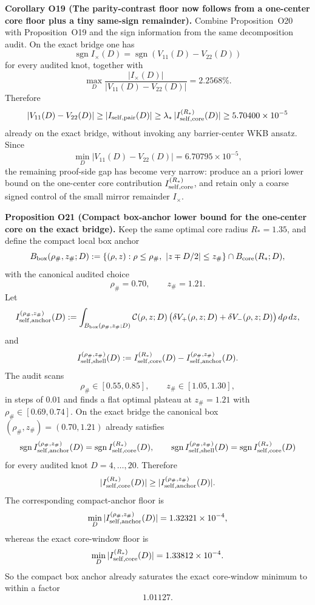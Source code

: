 \documentclass[aps,prd,onecolumn,notitlepage,nofootinbib,superscriptaddress,11pt,floatfix]{revtex4-2}
\begin{document}
\medskip\noindent\textbf{Corollary O19 (The parity-contrast floor now follows from a one-center core floor plus a tiny same-sign remainder).}
Combine Proposition~O20 with Proposition~O19 and the sign information from the same decomposition audit. On the exact bridge one has
\[
\operatorname{sgn} I_\times(D)=\operatorname{sgn}(V_{11}(D)-V_{22}(D))
\]
for every audited knot, together with
\[
\max_D \frac{|I_\times(D)|}{|V_{11}(D)-V_{22}(D)|}=2.2568\%.
\]
Therefore
\[
|V_{11}(D)-V_{22}(D)|
\ge
|I_{\rm self,pair}(D)|
\ge
\lambda_\ast\,|I_{\rm self,core}^{(R_\ast)}(D)|
\ge
5.70400\times10^{-5}
\]
already on the exact bridge, without invoking any barrier-center WKB ansatz. Since
\[
\min_D |V_{11}(D)-V_{22}(D)|=6.70795\times10^{-5},
\]
the remaining proof-side gap has become very narrow: produce an a priori lower bound on the one-center core contribution \(I_{\rm self,core}^{(R_\ast)}\), and retain only a coarse signed control of the small mirror remainder \(I_\times\).

\medskip\noindent\textbf{Proposition O21 (Compact box-anchor lower bound for the one-center core on the exact bridge).}
Keep the same optimal core radius \(R_\ast=1.35\), and define the compact local box anchor
\[
B_{\rm box}(\rho_\#,z_\#;D)
:=
\left\{(\rho,z): \rho\le \rho_\#,\ |z\mp D/2|\le z_\#\right\}\cap B_{\rm core}(R_\ast;D),
\]
with the canonical audited choice
\[
\rho_\#=0.70,\qquad z_\#=1.21.
\]
Let
\[
I_{\rm self,anchor}^{(\rho_\#,z_\#)}(D)
:=
\int_{B_{\rm box}(\rho_\#,z_\#;D)}
\mathcal C(\rho,z;D)\,
\bigl(\delta V_+(\rho,z;D)+\delta V_-(\rho,z;D)\bigr)\,d\rho\,dz,
\]
and
\[
I_{\rm self,shell}^{(\rho_\#,z_\#)}(D)
:=
I_{\rm self,core}^{(R_\ast)}(D)-I_{\rm self,anchor}^{(\rho_\#,z_\#)}(D).
\]
The audit  scans
\[
\rho_\#\in[0.55,0.85],\qquad z_\#\in[1.05,1.30],
\]
in steps of \(0.01\) and finds a flat optimal plateau at \(z_\#=1.21\) with \(\rho_\#\in[0.69,0.74]\).  On the exact bridge the canonical box \((\rho_\#,z_\#)=(0.70,1.21)\) already satisfies
\[
\operatorname{sgn} I_{\rm self,anchor}^{(\rho_\#,z_\#)}(D)
=
\operatorname{sgn} I_{\rm self,core}^{(R_\ast)}(D),
\qquad
\operatorname{sgn} I_{\rm self,shell}^{(\rho_\#,z_\#)}(D)
=
\operatorname{sgn} I_{\rm self,core}^{(R_\ast)}(D)
\]
for every audited knot \(D=4,\dots,20\). Therefore
\[
|I_{\rm self,core}^{(R_\ast)}(D)|
\ge
|I_{\rm self,anchor}^{(\rho_\#,z_\#)}(D)|.
\]
The corresponding compact-anchor floor is
\[
\min_D |I_{\rm self,anchor}^{(\rho_\#,z_\#)}(D)|
=
1.32321\times10^{-4},
\]
whereas the exact core-window floor is
\[
\min_D |I_{\rm self,core}^{(R_\ast)}(D)|
=
1.33812\times10^{-4}.
\]
So the compact box anchor already saturates the exact core-window minimum to within a factor
\[
1.01127.
\]
\end{document}
